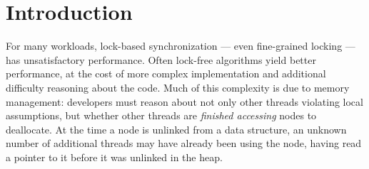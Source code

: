 \section{Introduction}



For many workloads, lock-based synchronization --- even fine-grained locking --- has unsatisfactory performance.  Often lock-free algorithms yield better performance, at the cost of more complex implementation and additional difficulty reasoning about the code.  Much of this complexity is due to memory management: 
developers must reason about not only other threads violating local assumptions, but whether other threads are \emph{finished accessing} nodes to deallocate. 
At the time a node is unlinked from a data structure, an unknown number of additional threads may have already been using the node, having read a pointer to it before it was unlinked in the heap.


